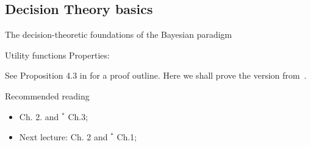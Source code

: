 \subsection{Decision Theory basics}
\begin{frame}{The decision-theoretic foundations of the Bayesian paradigm}
 \begin{defn}
 \label{def:loss_fn} 
 \end{defn}
\end{frame}
\begin{frame}{Utility functions}
Properties:
\end{frame}
\begin{frame}{}
 \begin{theo}[]
   \end{theo}
 See Proposition 4.3 in \cite{Bernardo2000} for a proof outline.
 Here we shall prove the version from~\cite{DeFinetti1931}.
  \begin{idea}[] 
  \end{idea}
\end{frame}
\begin{frame}{Recommended reading}
\begin{itemize}
  \item[\faBook] \cite{Robert2007} Ch. 2. and $^\ast$\cite{Schervish2012} Ch.3;
  \item[\faForward] Next lecture: \cite{Hoff2009} Ch. 2 and $^\ast$\cite{Schervish2012} Ch.1;
 \end{itemize} 
\end{frame}
